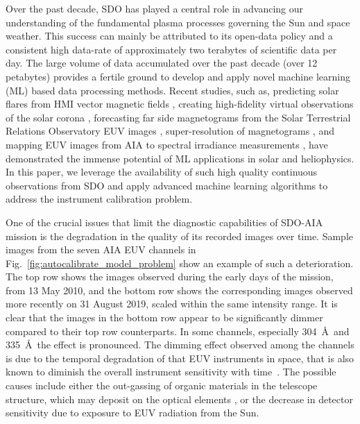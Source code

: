 \documentclass{aa}
\begin{document}
Over the past decade, SDO has played a central role in advancing our understanding of the fundamental plasma processes governing the Sun and space weather. This success can mainly be attributed to its open-data policy and a consistent high data-rate of approximately two terabytes of scientific data per day. The large volume of data accumulated over the past decade (over 12 petabytes) provides a fertile ground to develop and apply novel machine learning (ML) based data processing methods. Recent studies, such as, predicting solar flares from HMI vector magnetic fields \citep{Bobra_2015}, creating high-fidelity virtual observations of the solar corona \citep[\citealt{salvatelli2019} \&][]{Cheung2019}, forecasting far side magnetograms from the Solar Terrestrial Relations Observatory \citep[STEREO, ][]{Kaiser_2008} EUV images \citep{Kim_NatAs_2019}, super-resolution of magnetograms \citep{jungbluth-2019-super}, and mapping EUV images from AIA to spectral irradiance measurements \citep{Szenicereaaw6548}, have demonstrated the immense potential of ML applications in solar and heliophysics. In this paper, we leverage the availability of such high quality continuous observations from SDO and apply advanced machine learning algorithms to address the instrument calibration problem.

One of the crucial issues that limit the diagnostic capabilities of SDO-AIA mission is the degradation in the quality of its recorded images over time. Sample images from the seven AIA EUV channels in Fig.~\ref{fig:autocalibrate_model_problem} show an example of such a deterioration. The top row shows the images observed during the early days of the mission, from 13 May 2010, and the bottom row shows the corresponding images observed more recently on 31 August 2019, scaled within the same intensity range. It is clear that the images in the bottom row appear to be significantly dimmer compared to their top row counterparts. In some channels, especially 304~\AA\ and 335~\AA\, the effect is pronounced. 
The dimming effect observed among the channels is due to the temporal degradation of that EUV instruments in space, that is also known to diminish the overall instrument sensitivity with time~\citep[e.g.,][]{BenMoussa_etal_2013}. The possible causes include either the out-gassing of organic materials in the telescope structure, which may deposit on the optical elements \citep{Jiao_2019}, or the decrease in detector sensitivity due to exposure to EUV radiation from the Sun. 
\end{document}
